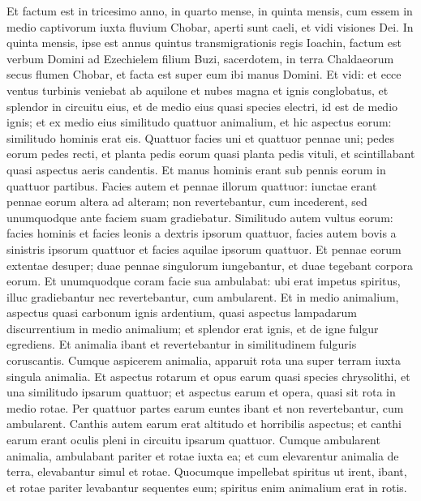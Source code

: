 \begin{biblechapter}
 \verse Et factum est in tricesimo anno, in quarto mense, in quinta mensis, cum essem in medio captivorum iuxta fluvium Chobar, aperti sunt caeli, et vidi visiones Dei. 
\verse In quinta mensis, ipse est annus quintus transmigrationis regis Ioachin, 
\verse factum est verbum Domini ad Ezechielem filium Buzi, sacerdotem, in terra Chaldaeorum secus flumen Chobar, et facta est super eum ibi manus Domini.
 \verse Et vidi: et ecce ventus turbinis veniebat ab aquilone et nubes magna et ignis conglobatus, et splendor in circuitu eius, et de medio eius quasi species electri, id est de medio ignis; 
\verse et ex medio eius similitudo quattuor animalium, et hic aspectus eorum: similitudo hominis erat eis. 
\verse Quattuor facies uni et quattuor pennae uni; 
\verse pedes eorum pedes recti, et planta pedis eorum quasi planta pedis vituli, et scintillabant quasi aspectus aeris candentis. 
\verse Et manus hominis erant sub pennis eorum in quattuor partibus. Facies autem et pennae illorum quattuor: 
\verse iunctae erant pennae eorum altera ad alteram; non revertebantur, cum incederent, sed unumquodque ante faciem suam gradiebatur.
 \verse Similitudo autem vultus eorum: facies hominis et facies leonis a dextris ipsorum quattuor, facies autem bovis a sinistris ipsorum quattuor et facies aquilae ipsorum quattuor.
 \verse Et pennae eorum extentae desuper; duae pennae singulorum iungebantur, et duae tegebant corpora eorum. 
\verse Et unumquodque coram facie sua ambulabat: ubi erat impetus spiritus, illuc gradiebantur nec revertebantur, cum ambularent.
 \verse Et in medio animalium, aspectus quasi carbonum ignis ardentium, quasi aspectus lampadarum discurrentium in medio animalium; et splendor erat ignis, et de igne fulgur egrediens. 
\verse Et animalia ibant et revertebantur in similitudinem fulguris coruscantis.
 \verse Cumque aspicerem animalia, apparuit rota una super terram iuxta singula animalia. 
\verse Et aspectus rotarum et opus earum quasi species chrysolithi, et una similitudo ipsarum quattuor; et aspectus earum et opera, quasi sit rota in medio rotae. 
\verse Per quattuor partes earum euntes ibant et non revertebantur, cum ambularent. 
\verse Canthis autem earum erat altitudo et horribilis aspectus; et canthi earum erant oculis pleni in circuitu ipsarum quattuor. 
\verse Cumque ambularent animalia, ambulabant pariter et rotae iuxta ea; et cum elevarentur animalia de terra, elevabantur simul et rotae. 
\verse Quocumque impellebat spiritus ut irent, ibant, et rotae pariter levabantur sequentes eum; spiritus enim animalium erat in rotis. 

\end{biblechapter}

